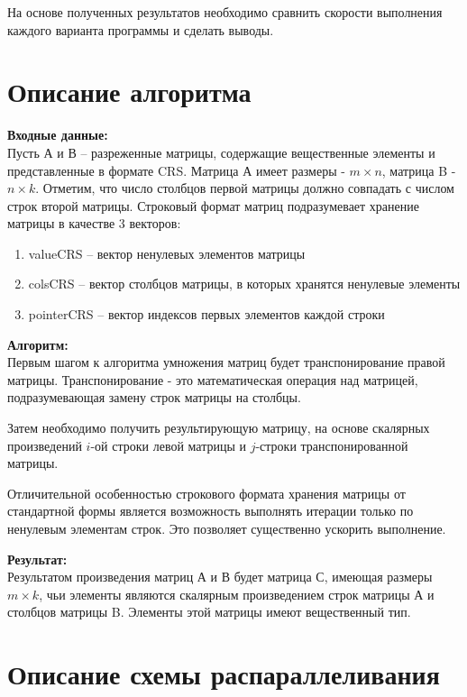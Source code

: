 \documentclass[14pt, russian]{extarticle}
\begin{document}
	На основе полученных результатов необходимо сравнить скорости выполнения каждого варианта программы и сделать выводы.
	
	\newpage

	\section{Описание алгоритма}
 
	\noindent\textbf{Входные данные:}\\
	\indent  Пусть А и В – разреженные матрицы, содержащие вещественные элементы и представленные в формате CRS. Матрица А имеет размеры - $m\times n$, матрица B - $n\times k$. Отметим, что число столбцов первой матрицы должно совпадать с числом строк второй матрицы. Строковый формат матриц подразумевает хранение матрицы в качестве 3 векторов:
     \begin{enumerate}
            \item  valueCRS – вектор ненулевых элементов матрицы
            \item  colsCRS – вектор столбцов матрицы, в которых хранятся ненулевые элементы
            \item  pointerCRS – вектор индексов первых элементов каждой строки
     \end{enumerate}
	\noindent\textbf{Алгоритм:}\\
    \indent Первым шагом к алгоритма умножения матриц будет транспонирование правой матрицы. 
    Транспонирование - это математическая операция над матрицей, подразумевающая замену строк матрицы на столбцы. 
    
    \indent Затем необходимо получить результирующую матрицу, на основе скалярных произведений $i$-ой строки левой матрицы и $j$-строки транспонированной матрицы. 
    
    \indent Отличительной особенностью строкового формата хранения матрицы от стандартной формы является возможность выполнять итерации только по ненулевым элементам строк. Это позволяет существенно ускорить выполнение.
    
	\noindent\textbf{Результат:}\\
	\indent  Результатом произведения матриц А и В будет матрица С, имеющая размеры $m \times k$, чьи элементы являются скалярным произведением строк матрицы А и столбцов матрицы B. Элементы этой матрицы имеют вещественный тип.
 \newpage
	
	\section{Описание схемы распараллеливания}
    
\end{document}
